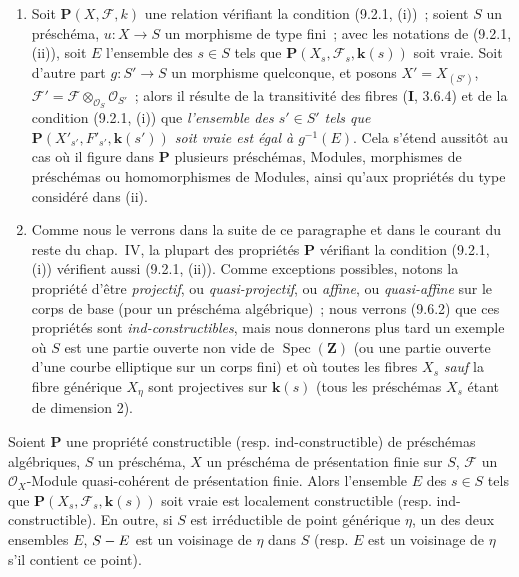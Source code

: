 \begin{remarks}[9.2.2]
\begin{enumerate}[label=(\roman*)]
  \item Soit $\boldsymbol{P}(X,\mathcal F,k)$ une relation vérifiant la condition
  (9.2.1, (i))~; soient $S$ un préschéma, $u:X\to S$ un morphisme de type
  fini~; avec les notations de (9.2.1, (ii)), soit $E$ l'ensemble des $s\in S$
  tels que $\boldsymbol{P}(X_s,\mathcal F_s,\boldsymbol{k}(s))$ soit vraie. Soit d'autre part
  $g:S'\to S$ un morphisme quelconque, et posons
  $X'=X_{(S')}$, $\mathcal F'=\mathcal F\otimes_{\mathcal O_S}\mathcal O_{S'}$~;
  alors il résulte de la transitivité des fibres (\textbf{I}, 3.6.4) et de la condition
  (9.2.1, (i)) que \emph{l'ensemble des $s'\in S'$ tels que
  $\boldsymbol{P}(X'_{s'},F'_{s'},\boldsymbol{k}(s'))$ soit vraie est égal à
  $g^{-1}(E)$}. Cela s'étend aussitôt au cas où il figure dans $\boldsymbol{P}$
  plusieurs préschémas, Modules, morphismes de préschémas ou homomorphismes de
  Modules, ainsi qu'aux propriétés du type considéré dans (ii).

  \item Comme nous le verrons dans la suite de ce paragraphe et dans le courant
  du reste du chap.~IV, la plupart des propriétés $\boldsymbol{P}$ vérifiant la
  condition (9.2.1, (i)) vérifient aussi (9.2.1, (ii)). Comme exceptions
  possibles, notons la propriété d'être \emph{projectif}, ou
  \emph{quasi-projectif}, ou \emph{affine}, ou \emph{quasi-affine} sur le
  corps de base (pour un préschéma algébrique)~; nous verrons (9.6.2) que ces
  propriétés sont \emph{ind-constructibles}, mais nous donnerons plus tard un
  exemple où $S$ est une partie ouverte non vide de $\operatorname{Spec}(\mathbf Z)$
  (ou une partie ouverte d'une courbe elliptique sur un corps fini) et où
  toutes les fibres $X_s$
  \emph{sauf} la fibre générique $X_\eta$ sont projectives sur $\boldsymbol{k}(s)$ (tous les
  préschémas $X_s$ étant de dimension 2).
\end{enumerate}
\end{remarks}

\begin{proposition}[9.2.3]
\label{IV.9.2.3-fr}
Soient $\boldsymbol{P}$ une propriété constructible (\textup{resp.} ind-constructible) de
préschémas algébriques, $S$ un préschéma, $X$ un préschéma de présentation
finie sur $S$, $\mathcal F$ un $\mathcal O_X$-Module quasi-cohérent de
présentation finie. Alors l'ensemble $E$ des $s\in S$ tels que
$\boldsymbol{P}(X_s,\mathcal F_s,\boldsymbol{k}(s))$ soit vraie est localement constructible
(\textup{resp.} ind-constructible). En outre, si $S$ est irréductible de point générique
$\eta$, un des deux ensembles $E$, $S- E$ est un voisinage de $\eta$ dans $S$
(\textup{resp.} $E$ est un voisinage de $\eta$ s'il contient ce point).
\end{proposition}

